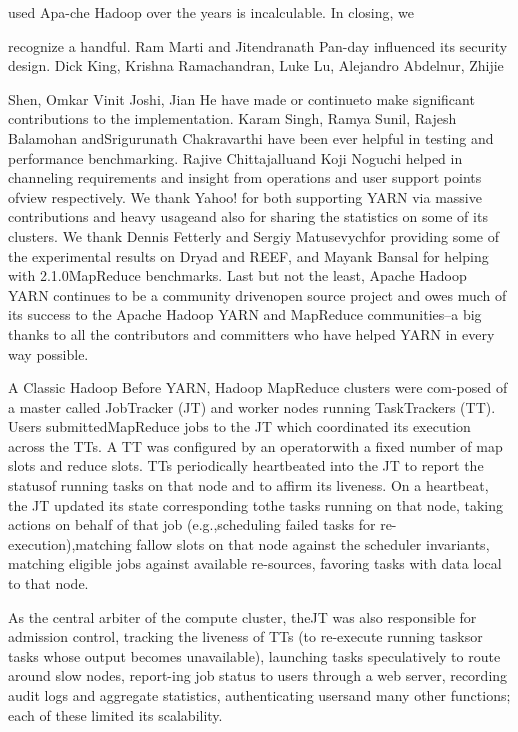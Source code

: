 used Apa-che Hadoop over the years is incalculable. In closing, we

recognize a handful. Ram Marti and Jitendranath Pan-day influenced its security design. Dick King, Krishna
Ramachandran, Luke Lu, Alejandro Abdelnur, Zhijie

Shen, Omkar Vinit Joshi, Jian He have made or continueto make significant contributions to the implementation. Karam Singh, Ramya Sunil, Rajesh Balamohan andSrigurunath Chakravarthi have been ever helpful in testing and performance benchmarking. Rajive Chittajalluand Koji Noguchi helped in channeling requirements
and insight from operations and user support points ofview respectively. We thank Yahoo! for both supporting YARN via massive contributions and heavy usageand also for sharing the statistics on some of its clusters. We thank Dennis Fetterly and Sergiy Matusevychfor providing some of the experimental results on Dryad
and REEF, and Mayank Bansal for helping with 2.1.0MapReduce benchmarks. Last but not the least, Apache Hadoop YARN continues to be a community drivenopen source project and owes much of its success to the
Apache Hadoop YARN and MapReduce communities--a big thanks to all the contributors and committers who
have helped YARN in every way possible.

A Classic Hadoop
Before YARN, Hadoop MapReduce clusters were com-posed of a master called JobTracker (JT) and worker
nodes running TaskTrackers (TT). Users submittedMapReduce jobs to the JT which coordinated its execution across the TTs. A TT was configured by an operatorwith a fixed number of map slots and reduce slots. TTs
periodically heartbeated into the JT to report the statusof running tasks on that node and to affirm its liveness.
On a heartbeat, the JT updated its state corresponding tothe tasks running on that node, taking actions on behalf
of that job (e.g.,scheduling failed tasks for re-execution),matching fallow slots on that node against the scheduler
invariants, matching eligible jobs against available re-sources, favoring tasks with data local to that node.

As the central arbiter of the compute cluster, theJT was also responsible for admission control, tracking the liveness of TTs (to re-execute running tasksor tasks whose output becomes unavailable), launching
tasks speculatively to route around slow nodes, report-ing job status to users through a web server, recording
audit logs and aggregate statistics, authenticating usersand many other functions; each of these limited its scalability.

